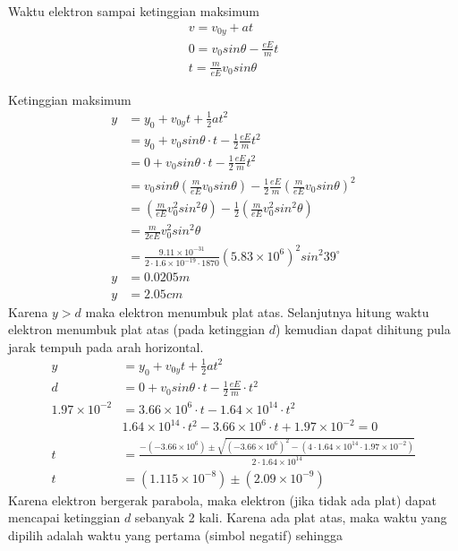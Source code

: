 \begin{enumerate}
    Waktu elektron sampai ketinggian maksimum
    \begin{align*}
        v=v_{0y}+at\\
        0=v_{0}sin\theta-\frac{eE}{m}t\\
        t =\frac{m}{eE}v_{0}sin\theta
    \end{align*}

    Ketinggian maksimum
    \begin{align*}
        y&=y_{0}+v_{0y}t+\frac{1}{2}at^{2}\\
        &=y_{0}+v_{0}sin\theta \cdot t-\frac{1}{2}\frac{eE}{m}t^{2}\\
        &=0+v_{0}sin\theta \cdot t-\frac{1}{2}\frac{eE}{m}t^{2}\\
        &=v_{0}sin\theta \left ( \frac{m}{eE}v_{0}sin\theta \right )-\frac{1}{2}\frac{eE}{m}\left ( \frac{m}{eE}v_{0}sin\theta \right )^{2}\\
        &=\left (\frac{m}{eE}v_{0}^{2}sin^{2}\theta\right )-\frac{1}{2}\left ( \frac{m}{eE}v_{0}^{2}sin^{2}\theta \right )\\
        &=\frac{m}{2eE}v_{0}^{2}sin^{2}\theta\\
        &=\frac{9.11\times 10^{-31}}{2\cdot 1.6\times 10^{-19}\cdot 1870}\left ( 5.83\times10^{6} \right )^{2}sin^{2}39^{\circ}\\
        y&=0.0205m\\
        y&=2.05cm
    \end{align*}
        Karena $y>d$ maka elektron menumbuk plat atas. Selanjutnya hitung waktu elektron menumbuk plat atas (pada ketinggian $d$) kemudian dapat dihitung pula jarak tempuh pada arah horizontal.
    \begin{align*}
        y&=y_{0}+v_{0y}t+\frac{1}{2}at^{2}\\
        d&= 0 +v_{0}sin\theta\cdot t-\frac{1}{2}\frac{eE}{m}\cdot t^{2}\\
        1.97\times10^{-2}&=3.66\times 10^{6}\cdot t-1.64\times 10^{14}\cdot t^{2}\\
        &1.64\times 10^{14}\cdot t^{2}-3.66\times 10^{6}\cdot t+1.97\times10^{-2}=0\\
        t&=\frac{-(-3.66\times 10^{6})\pm \sqrt{(-3.66\times 10^{6})^{2}-(4\cdot 1.64\times 10^{14}\cdot 1.97\times10^{-2})}}{2\cdot 1.64\times 10^{14}}\\
        t&=(1.115\times10^{-8})\pm (2.09\times10^{-9})
    \end{align*}
    Karena elektron bergerak parabola, maka elektron (jika tidak ada plat) dapat mencapai ketinggian $d$ sebanyak 2 kali. Karena ada plat atas, maka waktu yang dipilih adalah waktu yang pertama (simbol negatif) sehingga 

\end{enumerate}

